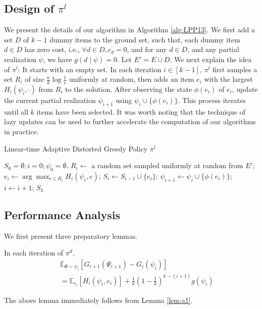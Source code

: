 \documentclass[twoside,leqno,twocolumn]{article}
\begin{document}
\subsection{Design of $\pi^l$} We present the details of our algorithm in Algorithm \ref{alg:LPP13}. We first add a set $D$ of $k-1$ dummy items to the ground set, such that, each dummy item $d\in D$ has zero cost, i.e., $\forall d\in D, c_d=0$, and for any $d \in D$, and any
partial realization $\psi$, we have $g(d \mid \psi) =0$. Let $E'=E\cup D$. We next explain the idea of $\pi^{l}$: It starts with an empty set. In each iteration $i\in[k-1]$,  $\pi^l$ first samples a set $R_i$ of size $\frac{n}{k}\log\frac{1}{\epsilon}$ uniformly at random,  then adds an item $e_i$ with the largest $H_i(\psi_i, \cdot)$ from $R_i$ to the solution. After observing the state $\phi(e_i)$ of $e_i$, update  the current partial realization $\psi_{i+1}$ using  $\psi_{i}\cup\{\phi(e_i)\}$.  This process iterates until all  $k$ items have been selected. %
It was worth noting that the technique of lazy updates \cite{minoux1978accelerated}  can be used to further accelerate the computation of our algorithms in practice.

\begin{algorithm}[hptb]
\caption{Linear-time Adaptive Distorted Greedy Policy $\pi^{l}$}
\label{alg:LPP13}
\begin{algorithmic}[1]
\STATE $S_0=\emptyset; i=0; \psi_0=\emptyset$.
\STATE $R_i\leftarrow$ a random set sampled uniformly at random  from $E'$;
\STATE $e_i\leftarrow \arg\max_{e \in R_i}H_i(\psi_i, e)$;
\STATE $S_i\leftarrow S_{i-1}\cup \{e_i\}$;
\STATE $\psi_{i+1}\leftarrow \psi_{i}\cup\{\phi(e_i)\}$;  $i\leftarrow i+1$;
\ENDWHILE
\RETURN $S_k$
\end{algorithmic}
\end{algorithm}

\subsection{Performance Analysis}
We first present three preparatory lemmas.
\begin{lemma}
\label{lem:b1}
In each iteration of $\pi^d$,
\begin{eqnarray*}
&&\mathbb{E}_{\Phi\sim \psi_i}[G_{i+1}(\Psi_{i+1})- G_{i}(\psi_i)] \\
&&= \mathbb{E}_{e_i}[H_i(\psi_i, e_i)]+\frac{1}{k}(1-\frac{1}{k})^{k-(i+1)} g(\psi_i)
\end{eqnarray*}
\end{lemma}
The above lemma immediately follows from Lemma \ref{lem:a1}.
\end{document}

